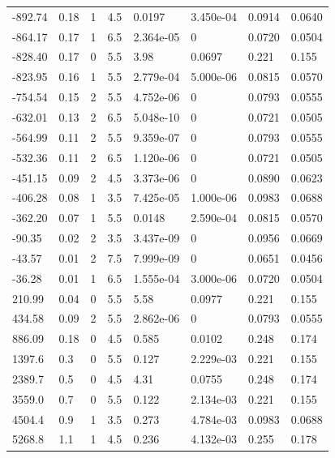 \documentclass[preview]{standalone}
\begin{document}
{{\begin{tabular}{L{1.2cm}C{1.2cm} C{0.3cm}C{0.5cm} C{1.4cm}C{1.4cm} C{1.4cm}C{1.4cm}}
  -892.74  &  0.18  & 1     & 4.5 &  0.0197  & 3.450e-04  & 0.0914 &  0.0640   \\ 
  -864.17  &  0.17  & 1     & 6.5 &  2.364e-05  & 0  & 0.0720 &  0.0504   \\ 
  -828.40  &  0.17  & 0     & 5.5 &  3.98  & 0.0697  & 0.221 &  0.155   \\ 
  -823.95  &  0.16  & 1     & 5.5 &  2.779e-04  & 5.000e-06  & 0.0815 &  0.0570   \\ 
  -754.54  &  0.15  & 2     & 5.5 &  4.752e-06  & 0  & 0.0793 &  0.0555   \\ 
  -632.01  &  0.13  & 2     & 6.5 &  5.048e-10  & 0  & 0.0721 &  0.0505   \\ 
  -564.99  &  0.11  & 2     & 5.5 &  9.359e-07  & 0  & 0.0793 &  0.0555   \\ 
  -532.36  &  0.11  & 2     & 6.5 &  1.120e-06  & 0  & 0.0721 &  0.0505   \\ 
  -451.15  &  0.09  & 2     & 4.5 &  3.373e-06  & 0  & 0.0890 &  0.0623   \\ 
  -406.28  &  0.08  & 1     & 3.5 &  7.425e-05  & 1.000e-06  & 0.0983 &  0.0688   \\ 
  -362.20  &  0.07  & 1     & 5.5 &  0.0148  & 2.590e-04  & 0.0815 &  0.0570   \\ 
  -90.35  &  0.02  & 2     & 3.5 &  3.437e-09  & 0  & 0.0956 &  0.0669   \\ 
  -43.57  &  0.01  & 2     & 7.5 &  7.999e-09  & 0  & 0.0651 &  0.0456   \\ 
  -36.28  &  0.01  & 1     & 6.5 &  1.555e-04  & 3.000e-06  & 0.0720 &  0.0504   \\ 
  210.99  &  0.04  & 0     & 5.5 &  5.58  & 0.0977  & 0.221 &  0.155   \\ 
  434.58  &  0.09  & 2     & 5.5 &  2.862e-06  & 0  & 0.0793 &  0.0555   \\ 
  886.09  &  0.18  & 0     & 4.5 &  0.585  & 0.0102  & 0.248 &  0.174   \\ 
  1397.6  &   0.3  & 0     & 5.5 &  0.127  & 2.229e-03  & 0.221 &  0.155   \\ 
  2389.7  &   0.5  & 0     & 4.5 &  4.31  & 0.0755  & 0.248 &  0.174   \\ 
  3559.0  &   0.7  & 0     & 5.5 &  0.122  & 2.134e-03  & 0.221 &  0.155   \\ 
  4504.4  &   0.9  & 1     & 3.5 &  0.273  & 4.784e-03  & 0.0983 &  0.0688   \\ 
  5268.8  &   1.1  & 1     & 4.5 &  0.236  & 4.132e-03  & 0.255 &  0.178   \\ 

\end{tabular}}}
\end{document}
